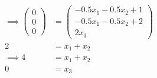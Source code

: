 \documentclass[12pt]{article}
\begin{document}
\begin{enumerate}
\begin{align*}
    \implies \begin{pmatrix}0\\ 0\\ 0\end{pmatrix} &= \begin{pmatrix}-0.5x_{1}-0.5x_{2}+1\\ -0.5x_{1}-0.5x_{2}+2\\ 2x_{3}\end{pmatrix}\\
    2 &= x_{1}+x_{2}\\
    \implies 4 &= x_{1}+x_{2}\\
    0 &= x_{3}
\end{align*}
\end{enumerate}
\end{document}
